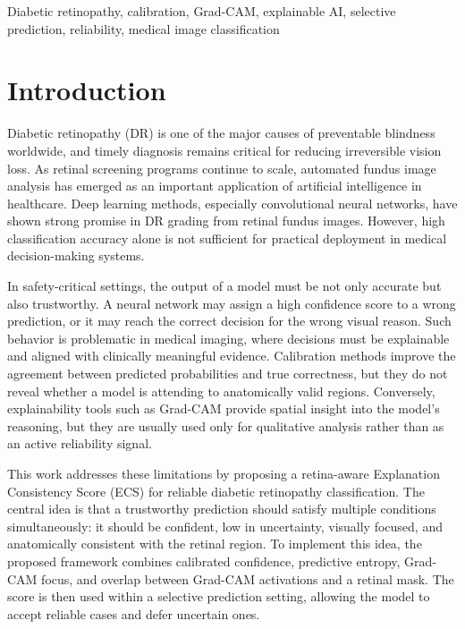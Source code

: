 \documentclass[conference]{IEEEtran}
\begin{document}
\begin{IEEEkeywords}
Diabetic retinopathy, calibration, Grad-CAM, explainable AI, selective prediction, reliability, medical image classification
\end{IEEEkeywords}

\section{Introduction}
Diabetic retinopathy (DR) is one of the major causes of preventable blindness worldwide, and timely diagnosis remains critical for reducing irreversible vision loss. As retinal screening programs continue to scale, automated fundus image analysis has emerged as an important application of artificial intelligence in healthcare. Deep learning methods, especially convolutional neural networks, have shown strong promise in DR grading from retinal fundus images. However, high classification accuracy alone is not sufficient for practical deployment in medical decision-making systems.

In safety-critical settings, the output of a model must be not only accurate but also trustworthy. A neural network may assign a high confidence score to a wrong prediction, or it may reach the correct decision for the wrong visual reason. Such behavior is problematic in medical imaging, where decisions must be explainable and aligned with clinically meaningful evidence. Calibration methods improve the agreement between predicted probabilities and true correctness, but they do not reveal whether a model is attending to anatomically valid regions. Conversely, explainability tools such as Grad-CAM provide spatial insight into the model’s reasoning, but they are usually used only for qualitative analysis rather than as an active reliability signal.

This work addresses these limitations by proposing a retina-aware Explanation Consistency Score (ECS) for reliable diabetic retinopathy classification. The central idea is that a trustworthy prediction should satisfy multiple conditions simultaneously: it should be confident, low in uncertainty, visually focused, and anatomically consistent with the retinal region. To implement this idea, the proposed framework combines calibrated confidence, predictive entropy, Grad-CAM focus, and overlap between Grad-CAM activations and a retinal mask. The score is then used within a selective prediction setting, allowing the model to accept reliable cases and defer uncertain ones.
\end{document}
